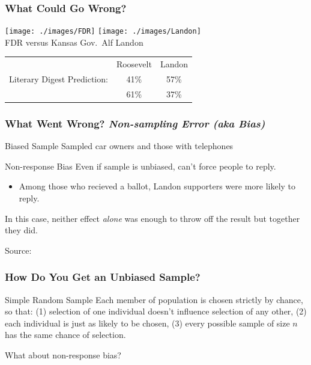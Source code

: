 \documentclass[handout]{beamer}
\begin{document}
\begin{frame}
\frametitle{What Could Go Wrong?}
	\begin{center}
		\texttt{[image: ./images/FDR]}
		\texttt{[image: ./images/Landon]}\\
		\small FDR versus Kansas Gov.\ Alf Landon
	\end{center}
	\normalsize
	\begin{center}
		\begin{tabular}{lcc}
									&Roosevelt		&Landon\\
		Literary Digest Prediction: 	&41\% 			& \alert{57\%}\\
		\onslide<3>{	Actual Result: 				&\alert{61\%} 	& 37\%}
		\end{tabular}
	\end{center}
	
\end{frame}

\begin{frame}
\frametitle{What Went Wrong? \emph{Non-sampling Error (aka Bias)}}
	\begin{block}{Biased Sample}
		Sampled car owners and those with telephones
	\end{block}
	
	\begin{block}{Non-response Bias}
	Even if sample is unbiased, can't force people to reply.
		\begin{itemize}
			\item Among those who recieved a ballot, Landon supporters were more likely to reply.
		\end{itemize}
	\end{block}
	\alert{In this case, neither effect \emph{alone} was enough to throw off the result but together 		they did.}
	
	\tiny{Source: \href{http://www.jstor.org/stable/10.2307/2749114}{}}
\end{frame}

\begin{frame}
\frametitle{How Do You Get an Unbiased Sample?}
	\begin{block}{Simple Random Sample}	
		Each member of population is chosen strictly by chance, so that: (1) selection of one 					individual doesn't influence selection of any other, (2) each individual is just as likely to be 			chosen, (3) every possible sample of size $n$ has the same chance of selection.	
	\end{block}
	
	\begin{block}{What about non-response bias?}
	\end{block}
\end{frame}
\end{document}
